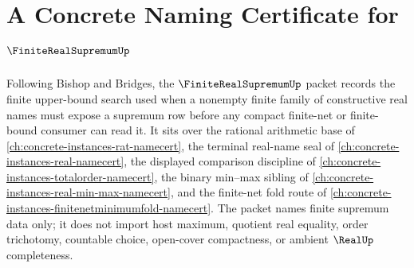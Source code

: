 \chapter{A Concrete Naming Certificate for $\FiniteRealSupremumUp$}
\label{ch:concrete-instances-finite-real-supremum-namecert}

Following Bishop and Bridges, the $\FiniteRealSupremumUp$ packet records the finite upper-bound search used when a nonempty finite family of constructive real names must expose a supremum row before any compact finite-net or finite-bound consumer can read it. It sits over the rational arithmetic base of \autoref{ch:concrete-instances-rat-namecert}, the terminal real-name seal of \autoref{ch:concrete-instances-real-namecert}, the displayed comparison discipline of \autoref{ch:concrete-instances-totalorder-namecert}, the binary min--max sibling of \autoref{ch:concrete-instances-real-min-max-namecert}, and the finite-net fold route of \autoref{ch:concrete-instances-finitenetminimumfold-namecert}. The packet names finite supremum data only; it does not import host maximum, quotient real equality, order trichotomy, countable choice, open-cover compactness, or ambient $\RealUp$ completeness.

